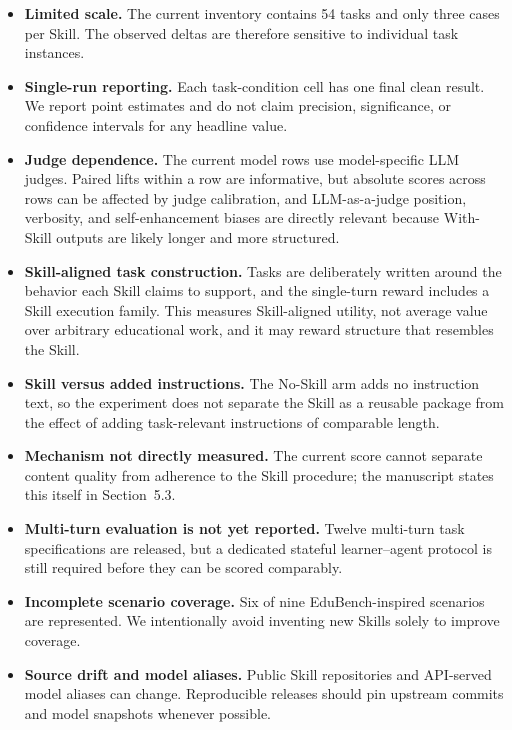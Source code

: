 \documentclass[10pt]{article}
\begin{document}
\begin{itemize}
  \item \textbf{Limited scale.} The current inventory contains 54 tasks and only three cases per Skill. The observed deltas are therefore sensitive to individual task instances.
  \item \textbf{Single-run reporting.} Each task-condition cell has one final clean result. We report point estimates and do not claim precision, significance, or confidence intervals for any headline value.
  \item \textbf{Judge dependence.} The current model rows use model-specific LLM judges. Paired lifts within a row are informative, but absolute scores across rows can be affected by judge calibration, and LLM-as-a-judge position, verbosity, and self-enhancement biases \cite{llmjudge} are directly relevant because With-Skill outputs are likely longer and more structured.
  \item \textbf{Skill-aligned task construction.} Tasks are deliberately written around the behavior each Skill claims to support, and the single-turn reward includes a Skill execution family. This measures Skill-aligned utility, not average value over arbitrary educational work, and it may reward structure that resembles the Skill.
  \item \textbf{Skill versus added instructions.} The No-Skill arm adds no instruction text, so the experiment does not separate the Skill as a reusable package from the effect of adding task-relevant instructions of comparable length.
  \item \textbf{Mechanism not directly measured.} The current score cannot separate content quality from adherence to the Skill procedure; the manuscript states this itself in Section~5.3.
  \item \textbf{Multi-turn evaluation is not yet reported.} Twelve multi-turn task specifications are released, but a dedicated stateful learner--agent protocol is still required before they can be scored comparably.
  \item \textbf{Incomplete scenario coverage.} Six of nine EduBench-inspired scenarios are represented. We intentionally avoid inventing new Skills solely to improve coverage.
  \item \textbf{Source drift and model aliases.} Public Skill repositories and API-served model aliases can change. Reproducible releases should pin upstream commits and model snapshots whenever possible.
\end{itemize}
\end{document}
